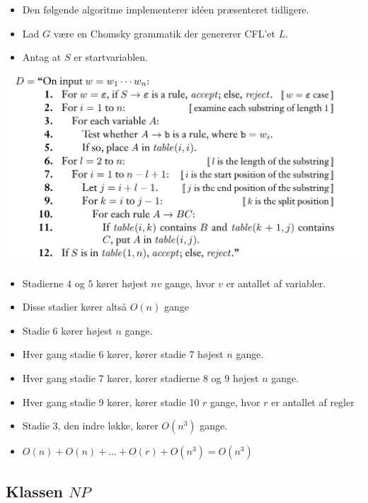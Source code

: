 \begin{frame}[allowframebreaks]
\begin{itemize}
    \item Den følgende algoritme implementerer idéen præsenteret tidligere.
    \item Lad $G$ være en Chomsky grammatik der genererer CFL'et $L$.
    \item Antag at $S$ er startvariablen.
  \end{itemize}
  \includegraphics[scale=0.3]{figur/polycfg.png}
  \begin{itemize}
    \item Stadierne $4$ og $5$ kører højest $nv$ gange, hvor $v$ er antallet af variabler.
    \item Disse stadier kører altså $O(n)$ gange
    \item Stadie 6 kører højest $n$ gange.
    \item Hver gang stadie 6 kører, kører stadie 7 højest $n$ gange.
    \item Hver gang stadie 7 kører, kører stadierne 8 og 9 højest $n$ gange.
    \item Hver gang stadie 9 kører, kører stadie 10 $r$ gange, hvor $r$ er antallet af regler
    \item Stadie 3, den indre løkke, kører $O(n^{3})$ gange.
    \item $O(n) + O(n) + \ldots + O(r) + O(n^{3}) = O(n^{3})$
  \end{itemize}
\end{frame}

\subsection{Klassen $NP$}%
\label{subsec:label}

